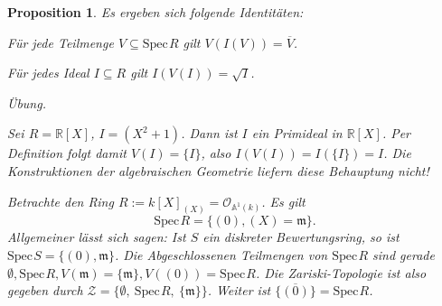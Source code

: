 \documentclass[11pt]{book}
\newtheorem{proposition}[theorem]{Proposition}
\theoremstyle{nonumberbreak}
\newenvironment{pr}[1][]{\ifthenelse{\equal{#1}{}}{\proof}{\proof[#1]}\rm}{\endproof}
\newenvironment{ex}[1][]{\ifthenelse{\equal{#1}{}}{\example}{\example[#1]}\rm}{\endexample}
\newcommand{\spec}{\mathrm{Spec} \hspace{1pt} }
\begin{document}
\begin{spacing}{1.4}
\begin{proposition} %
Es ergeben sich folgende Identitäten:
\begin{compactenum}
\item Für jede Teilmenge $V \subseteq \spec R$ gilt $V\left(I\left(V\right)\right) = \overline{V}$.
\item Für jedes Ideal $I \subseteq R$ gilt $I\left(V\left(I\right)\right)= \sqrt{I}$.
\end{compactenum}
\begin{pr}
Übung.
\end{pr}

\begin{ex} Sei $R=\mathbb{R}[X]$, $I=( X^2+1)$. Dann ist $I$ ein Primideal in $\mathbb{R}[X]$. Per Definition folgt damit $V(I)= \{I\}$, also $I(V(I))= I(\{I\}) = I$. Die Konstruktionen der algebraischen Geometrie liefern diese Behauptung nicht!
\end{ex}

\begin{ex}
Betrachte den Ring $R:=k[X]_{( X )} = \mathcal{O}_{\mathbb{A}^1(k)}$. Es gilt
$$\spec R = \{ ( 0 ), ( X ) = \mathfrak{m} \}.$$
Allgemeiner lässt sich sagen: Ist $S$ ein diskreter Bewertungsring, so ist $\spec S = \{( 0 ), \mathfrak{m} \}$. Die Abgeschlossenen Teilmengen von $\spec R$ sind gerade $\emptyset, \spec R, V(\mathfrak{m}) = \{\mathfrak{m}\}, V(( 0 )) = \spec R$. Die Zariski-Topologie ist also gegeben durch $\mathcal{Z}=\{ \emptyset,\ \spec R,\ \{\mathfrak{m} \} \}$. Weiter ist $\overline{\{ ( 0 ) \} } = \spec R$.
\end{ex}


\end{proposition}
\end{spacing}
\end{document}
